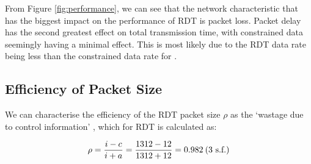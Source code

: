 From Figure \ref{fig:performance}, we can see that the network characteristic that has the biggest impact on the performance of RDT is packet loss. Packet delay has the second greatest effect on total transmission time, with constrained data seemingly having a minimal effect. This is most likely due to the RDT data rate being less than the constrained data rate for .


\subsection{Efficiency of Packet Size}

We can characterise the efficiency of the RDT packet size $\rho$ as the `wastage due to control information' \cite{slides}, which for RDT is calculated as:

\begin{align*}
    \rho = \frac{i - c}{i + a} = \frac{1312 - 12}{1312 + 12} = 0.982 \text{\:(3 s.f.)}
\end{align*}